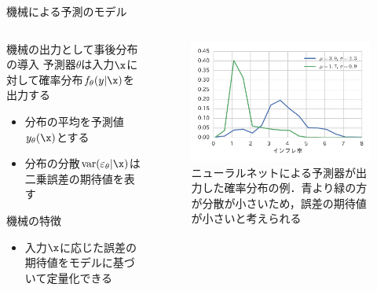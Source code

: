 \documentclass[dvipdfmx,aspectratio=169]{beamer}
\DeclareMathOperator{\var}{var}
\newcommand{\varm}{\var(\varepsilon_\theta|\x)}
\begin{document}
\begin{frame}{機械による予測のモデル}
  \begin{columns}
    \begin{column}{0.5\textwidth}
      \begin{block}{機械の出力として事後分布の導入}
        予測器$\theta$は入力$\x$に対して\alert{確率分布$f_\theta(y|\x)$}を出力する
        \begin{itemize}
          \item 分布の平均を予測値$y_\theta(\x)$とする
          \item 分布の分散$\varm$は二乗誤差の期待値を表す
        \end{itemize}
      \end{block}
      \begin{alertblock}{機械の特徴}
        \begin{itemize}
          \item 入力$\x$に応じた誤差の期待値をモデルに基づいて定量化できる
        \end{itemize}
      \end{alertblock}
    \end{column}
    \begin{column}{0.5\textwidth}
      \begin{figure}
        \centering
        \includegraphics[width=\columnwidth]{slide-machine_outputs.pdf}
        \caption{ニューラルネットによる予測器が出力した確率分布の例．青より緑の方が分散が小さいため，誤差の期待値が小さいと考えられる}
      \end{figure}
    \end{column}
  \end{columns}
\end{frame}
\end{document}
